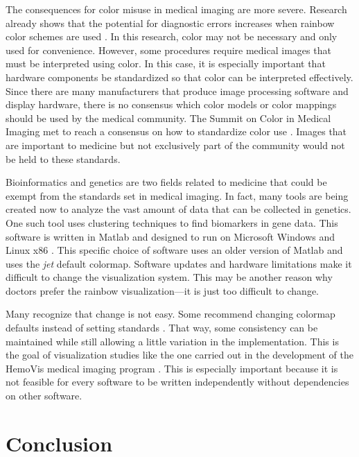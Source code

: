 \documentclass[journal]{IEEEtran}
\begin{document}
The consequences for color misuse in medical imaging are more severe. Research
already shows that the potential for diagnostic errors increases when 
rainbow color schemes are used \cite{arteryvis}. In this research, color may not
be necessary and only used for convenience. However, some procedures require 
medical images that must be interpreted using color. In this case, it
is especially important that hardware components be standardized so that color
can be interpreted effectively. Since there are many manufacturers that produce
image processing software and display hardware, there is no consensus which 
color models or color mappings should be used by the medical community.
The Summit on Color in Medical Imaging
met to reach a consensus on how to standardize color use 
\cite{standardmedimg}. Images that are important to medicine but not exclusively
part of the community would not be held to these standards.

Bioinformatics and genetics are two fields related to medicine that 
could be exempt from the standards set in medical imaging. In fact, many tools
are being created now to analyze the vast amount of data that can be collected
in genetics. One such tool uses clustering techniques to find biomarkers in 
gene data. This software is written in Matlab and designed to run on Microsoft
Windows and Linux x86 \cite{marvis}. This specific choice of software uses an
older version of Matlab and uses the \textit{jet} default colormap. 
Software updates and hardware limitations make it difficult to change 
the visualization system. This may be another reason why doctors prefer
the rainbow visualization---it is just too difficult to change.

Many recognize that change is not easy. Some recommend changing 
colormap defaults instead of setting standards \cite{viridis}. That way, some 
consistency can be maintained while still allowing a little variation in the
implementation. This is the goal of visualization studies like the one 
carried out in the development of the HemoVis medical imaging program 
\cite{arteryvis}. This is especially important because it is not feasible for
every software to be written independently without dependencies on other
software.

\section{Conclusion}
\end{document}
